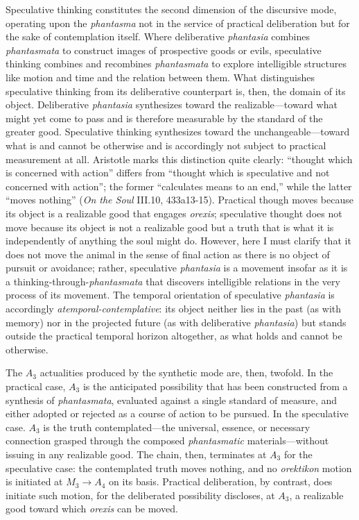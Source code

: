 \documentclass{article}
\begin{document}
Speculative thinking constitutes the second dimension of the discursive mode, operating upon the \textit{phantasma} not in the service of practical deliberation but for the sake of contemplation itself. Where deliberative \textit{phantasia} combines \textit{phantasmata} to construct images of prospective goods or evils, speculative thinking combines and recombines \textit{phantasmata} to explore intelligible structures like motion and time and the relation between them. What distinguishes speculative thinking from its deliberative counterpart is, then, the domain of its object. Deliberative \textit{phantasia} synthesizes toward the realizable---toward what might yet come to pass and is therefore measurable by the standard of the greater good. Speculative thinking synthesizes toward the unchangeable---toward what is and cannot be otherwise and is accordingly not subject to practical measurement at all. Aristotle marks this distinction quite clearly: ``thought which is concerned with action'' differs from ``thought which is speculative and not concerned with action''; the former ``calculates means to an end,'' while the latter ``moves nothing'' (\textit{On the Soul} III.10, 433a13-15).  Practical though moves because its object is a realizable good that engages \textit{orexis}; speculative thought does not move because its object is not a realizable good but a truth that is what it is independently of anything the soul might do. However, here I must clarify that it does not move the animal in the sense of final action as there is no object of pursuit or avoidance; rather, speculative \textit{phantasia} is a movement insofar as it is a thinking-through-\textit{phantasmata} that discovers intelligible relations in the very process of its movement. The temporal orientation of speculative \textit{phantasia} is accordingly \textit{atemporal-contemplative}: its object neither lies in the past (as with memory) nor in the projected future (as with deliberative \textit{phantasia}) but stands outside the practical temporal horizon altogether, as what holds and cannot be otherwise. 

The $A_3$ actualities produced by the synthetic mode are, then, twofold. In the practical case, $A_3$ is the anticipated possibility that has been constructed from a synthesis of \textit{phantasmata}, evaluated against a single standard of measure, and either adopted or rejected as a course of action to be pursued. In the speculative case. $A_3$ is the truth contemplated---the universal, essence, or necessary connection grasped through the composed \textit{phantasmatic} materials---without issuing in any realizable good. The chain, then, terminates at $A_3$ for the speculative case: the contemplated truth moves nothing, and no \textit{orektikon} motion is initiated at $M_3 \to A_4$ on its basis. Practical deliberation, by contrast, does initiate such motion, for the deliberated possibility discloses, at $A_3$, a realizable good toward which \textit{orexis} can be moved. 
\end{document}
